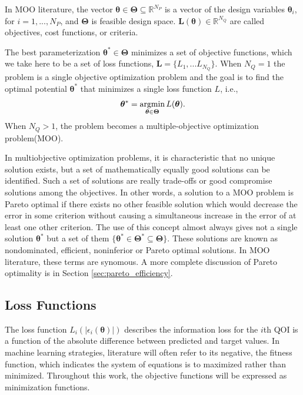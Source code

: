 In MOO literature, the vector $\bm{\theta} \in \bm{\Theta} \subseteq \mathbb{R}^{N_P}$ is a vector of the design variables $\bm{\theta}_i$, for $i=1,...,N_P$, and $\bm{\Theta}$ is feasible design space.  $\bm{L}(\bm{\theta}) \in \mathbb{R}^{N_Q}$ are called objectives, cost functions, or criteria.

The best parameterization $\bm{\theta}^* \in \bm{\Theta}$ minimizes a set of objective functions, which we take here to be a set of loss functions, $\bm{L}=\{L_1,...L_{N_Q}\}$.  When $N_Q=1$ the problem is a single objective optimization problem and the goal is to find the optimal potential $\bm{\theta}^*$ that minimizes a single loss function $L$, i.e.,
\begin{equation}
	\bm{\theta}^* = \operatorname*{argmin}_{\bm{\theta}\in\bm{\Theta}} L(\bm{\theta}).
\end{equation}
When $N_Q>1$, the problem becomes a multiple-objective optimization problem(MOO).

In multiobjective optimization problems, it is characteristic that no unique solution exists, but a set of mathematically equally good solutions can be identified.   Such a set of solutions are really trade-offs or good compromise solutions among the objectives.  In other words, a solution to a MOO problem is Pareto optimal if there exists no other feasible solution which would decrease the error in some criterion without causing a simultaneous increase in the error of at least one other criterion. The use of this concept almost always gives not a single solution $\bm{\theta}^*$ but a set of them $\{\bm{\theta}^*\in \bm{\Theta}^* \subseteq \bm{\Theta}\}$.  These solutions are known as nondominated, efficient, noninferior or Pareto optimal solutions.  In MOO literature, these terms are synomous.  A more complete discussion of Pareto optimality is in Section \ref{sec:pareto_efficiency}.

\subsection{Loss Functions}
\label{sec:loss_functions}
The loss function
$L_i(|\epsilon_i(\bm{\theta})|)$ describes the information loss for the $i$th QOI is a function of the absolute difference between predicted and target values.  In machine learning strategies, literature will often refer to its negative, the fitness function, which indicates the system of equations is to maximized rather than minimized.  Throughout this work, the objective functions will be expressed as minimization functions.

